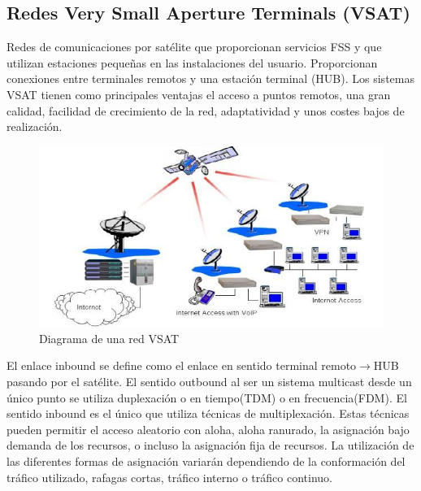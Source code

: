 	\subsection{Redes Very Small Aperture Terminals (VSAT)}
	\label{sub:vsat}
		Redes de comunicaciones por satélite que proporcionan servicios FSS y que utilizan estaciones pequeñas en las instalaciones del usuario. Proporcionan conexiones entre terminales remotos y una estación terminal (HUB). Los sistemas VSAT tienen como principales ventajas el acceso a puntos remotos, una gran calidad, facilidad de crecimiento de la red, adaptatividad y unos costes bajos de realización.
		\begin{figure}[H]
		\centering
		\includegraphics[width=\textwidth]{Imagen/diavsat.jpg}
		\caption{Diagrama de una red VSAT}
		\end{figure}
		El enlace inbound se define como el enlace en sentido terminal remoto$\to$HUB pasando por el satélite. El sentido outbound al ser un sistema multicast desde un único punto se utiliza duplexación o en tiempo(TDM) o en frecuencia(FDM). El sentido inbound es el único que utiliza técnicas de multiplexación. Estas técnicas pueden permitir el acceso aleatorio con aloha, aloha ranurado, la asignación bajo demanda de los recursos, o incluso la asignación fija de recursos. La utilización de las diferentes formas de asignación variarán dependiendo de la conformación del tráfico utilizado, rafagas cortas, tráfico interno o tráfico continuo.
